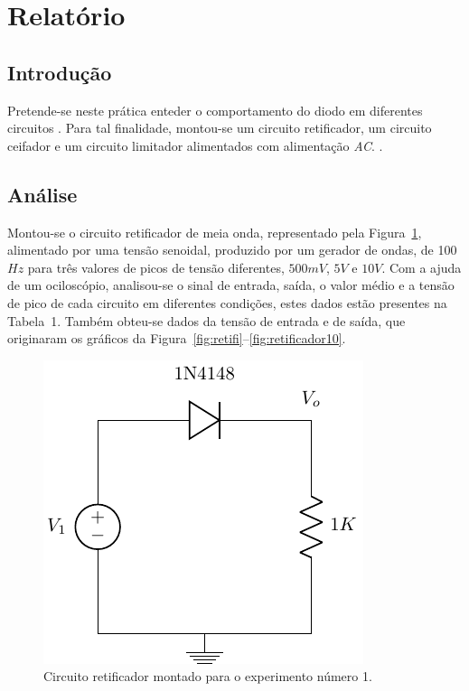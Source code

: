 \documentclass[12pt,a4paper]{article}
\begin{document}
\setcounter{figure}{3}
\setcounter{section}{3}
\setcounter{page}{7}
\section{Relatório}
\subsection{Introdução}
Pretende-se neste prática enteder o comportamento do diodo em diferentes circuitos . Para tal finalidade, montou-se um circuito retificador, um circuito ceifador e um circuito limitador alimentados com alimentação \emph{AC}.
.

\subsection{Análise}
Montou-se o circuito retificador de meia onda, representado pela Figura~\ref{fig:circ_retif}, alimentado por uma tensão senoidal,    produzido por um gerador de ondas, de 100$Hz$ para três valores de  picos de tensão diferentes, $500mV$, $5V$ e $10V$. 
Com a ajuda de um ociloscópio, analisou-se o sinal de entrada, saída, o valor médio e a tensão de pico de cada circuito em diferentes condições, estes dados estão presentes na Tabela~1. Também obteu-se dados da tensão de entrada e de saída, que originaram os gráficos da Figura~\ref{fig:retifi}--\ref{fig:retificador10}.
\begin{figure}[htpb]
  \centering
  \includegraphics{./circ_retif.pdf}
  \caption{Circuito retificador montado para o experimento número 1.}
  \label{fig:circ_retif}
\end{figure}
\end{document}
